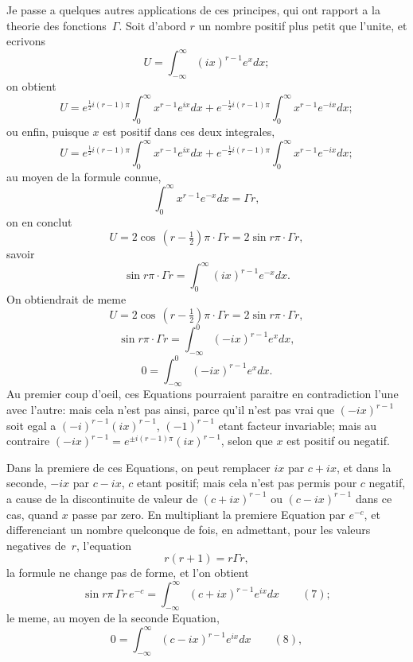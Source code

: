 \documentclass[11pt,a4paper]{book}
\begin{document}
\newpage
Je passe a quelques autres applications de ces principes, qui ont rapport a la theorie des fonctions~$\Gamma$. Soit d'abord $r$ un nombre positif plus petit que l'unite, et ecrivons
\[
U = \int_{-\infty}^{\infty} (ix)^{r-1} e^x dx;
\]
on obtient
\[
U = e^{\frac{1}{2}i(r-1)\pi} \int_0^{\infty} x^{r-1} e^{ix} dx + e^{-\frac{1}{2}i(r-1)\pi} \int_0^{\infty} x^{r-1} e^{-ix} dx;
\]
ou enfin, puisque $x$ est positif dans ces deux integrales,
\[
U = e^{\frac{1}{2}i(r-1)\pi} \int_0^{\infty} x^{r-1} e^{ix} dx + e^{-\frac{1}{2}i(r-1)\pi} \int_0^{\infty} x^{r-1} e^{-ix} dx;
\]
au moyen de la formule connue,
\[
\int_0^{\infty} x^{r-1} e^{-x} dx = \Gamma r,
\]
on en conclut
\[
U = 2\cos\,(r-\tfrac{1}{2})\pi \cdot \Gamma r = 2\sin r\pi \cdot \Gamma r,
\]
savoir
\[
\sin r\pi \cdot \Gamma r = \int_0^{\infty} (ix)^{r-1} e^{-x} dx.
\]
On obtiendrait de meme
\[
U = 2\cos\,(r-\tfrac{1}{2})\pi \cdot \Gamma r = 2\sin r\pi \cdot \Gamma r,
\]
\[
\sin r\pi \cdot \Gamma r = \int_{-\infty}^{0} (-ix)^{r-1} e^x dx,
\]
\[
0 = \int_{-\infty}^{0} (-ix)^{r-1} e^x dx.
\]
Au premier coup d'oeil, ces Equations pourraient paraitre en contradiction l'une avec l'autre: mais cela n'est pas ainsi, parce qu'il n'est pas vrai que $(-ix)^{r-1}$ soit egal a $(-i)^{r-1}(ix)^{r-1}$, $(-1)^{r-1}$ etant facteur invariable; mais au contraire $(-ix)^{r-1} = e^{\pm i(r-1)\pi}(ix)^{r-1}$, selon que $x$ est positif ou negatif.

Dans la premiere de ces Equations, on peut remplacer $ix$ par $c+ix$, et dans la seconde, $-ix$ par $c-ix$, $c$ etant positif; mais cela n'est pas permis pour $c$ negatif, a cause de la discontinuite de valeur de $(c+ix)^{r-1}$ ou $(c-ix)^{r-1}$ dans ce cas, quand $x$ passe par zero. En multipliant la premiere Equation par $e^{-c}$, et differenciant un nombre quelconque de fois, en admettant, pour les valeurs negatives de~$r$, l'equation
\[
r(r+1) = r\Gamma r,
\]
la formule ne change pas de forme, et l'on obtient
\[
\sin r\pi \, \Gamma r \, e^{-c} = \int_{-\infty}^{\infty} (c+ix)^{r-1} e^{ix} dx \qquad(7);
\]
le meme, au moyen de la seconde Equation,
\[
0 = \int_{-\infty}^{\infty} (c-ix)^{r-1} e^{ix} dx \qquad(8),
\]
\end{document}
